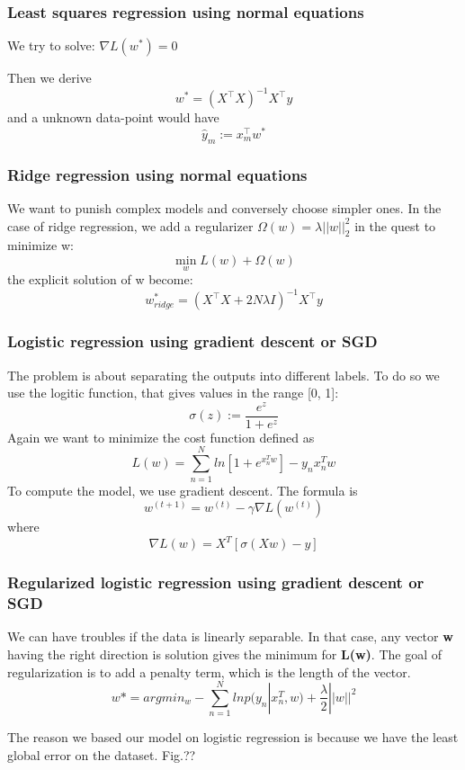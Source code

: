 \documentclass[10pt,conference,compsocconf]{IEEEtran}
\begin{document}
	
\subsubsection{Least squares regression using normal equations}
	
	We try to solve: $\nabla L(w^*) = 0$
	
	Then we derive
	$$w^* = (X^\top X)^{-1}X^\top y$$
	and a unknown data-point would have 
	$$\hat y_m := x_m^\top w^*$$
	
\subsubsection{Ridge regression using normal equations}
	
	We want to punish complex models and conversely choose simpler ones.
	In the case of ridge regression, we add a regularizer $\Omega(w) = \lambda||w||_2^2$ in the quest to minimize w:
	$$\min\limits_{w} L(w) + \Omega(w)$$
	the explicit solution of w become:
	$$w_{ridge}^* = (X^\top X+2N\lambda I)^{-1}X^\top y$$
\subsubsection{Logistic regression using gradient descent or SGD}
	
    The problem is about separating the outputs into different labels. To do so we use the logitic function, that gives values in the range [0, 1]:
    $$\sigma(z) := \frac{e^z}{1 + e^z}$$
	Again we want to minimize the cost function defined as 
    $$ L(w) = \sum\limits_{n=1}^N ln[1 + e^{x_n^Tw}] - y_nx_n^Tw$$
    To compute the model, we use gradient descent. The formula is 
    $$w^{(t+1)}=w^{(t)} -\gamma \nabla L(w^{(t)})$$
    where  $$\nabla L(w) = X^T[\sigma(Xw) - y]$$ 
   
\subsubsection{Regularized logistic regression using gradient descent or SGD}
	We can have troubles if the data is linearly separable. In that case, any vector \textbf{w} having the right direction is solution gives the minimum for \textbf{L(w)}. The goal of regularization is to add a penalty term, which is the length of the vector.
    $$ w* = argmin_w - \sum\limits_{n=1}^N ln p(y_n|x_n^T, w) + \frac{\lambda}{2}||w||^2 $$


The reason we based our model on logistic regression is because we have the least global error on the dataset. Fig.?? 
\end{document}

